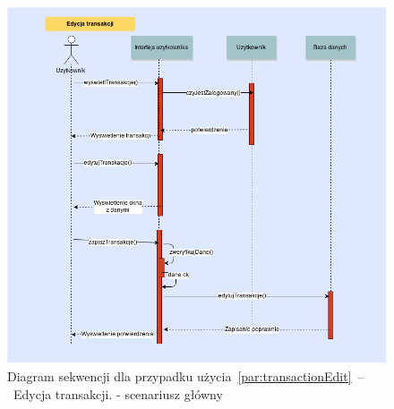 \begin{figure}[H]
    \includegraphics[width=\textwidth,
    height=0.5\textheight]{images/edycja_transakcji.png}
    \caption{Diagram sekwencji dla przypadku użycia~\ref{par:transactionEdit}~--~Edycja transakcji.
    - scenariusz główny}
\end{figure}

